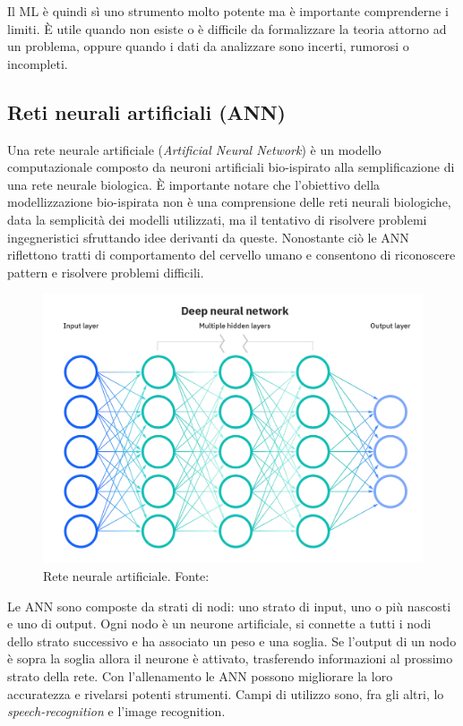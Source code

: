 Il ML è quindi sì uno strumento molto potente ma è importante comprenderne i limiti. È utile quando non esiste o è difficile da formalizzare la teoria attorno ad un problema, oppure quando i dati da analizzare sono incerti, rumorosi o incompleti.

\subsection{Reti neurali artificiali (ANN)}

Una rete neurale artificiale (\textit{Artificial Neural Network}) è un modello computazionale composto da neuroni artificiali bio-ispirato alla semplificazione di una rete neurale biologica. È importante notare che l'obiettivo della modellizzazione bio-ispirata non è una comprensione delle reti neurali biologiche, data la semplicità dei modelli utilizzati, ma il tentativo di risolvere problemi ingegneristici sfruttando idee derivanti da queste. Nonostante ciò le ANN riflettono tratti di comportamento del cervello umano e consentono di riconoscere pattern e risolvere problemi difficili.

\begin{figure}[!h]
	\centering
	\includegraphics[scale=0.2]{images/ann.png}
	\caption{Rete neurale artificiale. Fonte: \cite{neuralNetworksIBM}}
	\label{fig:rete-neurale}
\end{figure}

\par Le ANN sono composte da strati di nodi: uno strato di input, uno o più nascosti e uno di output. Ogni nodo è un neurone artificiale, si connette a tutti i nodi dello strato successivo e ha associato un peso e una soglia. Se l'output di un nodo è sopra la soglia allora il neurone è attivato, trasferendo informazioni al prossimo strato della rete. Con l'allenamento le ANN possono migliorare la loro accuratezza e rivelarsi potenti strumenti. Campi di utilizzo sono, fra gli altri, lo \textit{speech-recognition} e l'{image recognition}.

